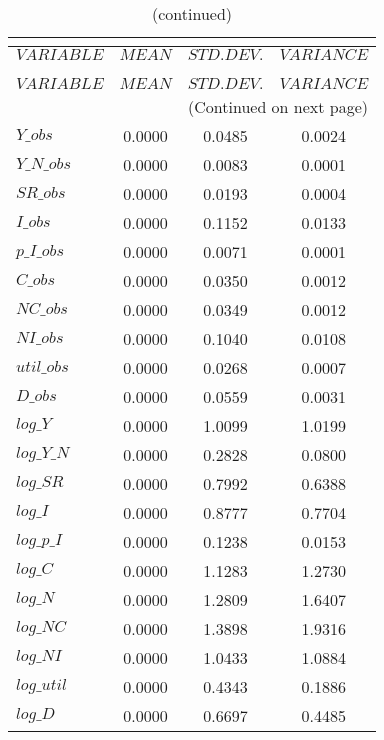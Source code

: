  
\begin{center}
\begin{longtable}{lccc} 
\caption{THEORETICAL MOMENTS}\\
 \label{Table:th_moments}\\
\toprule 
$VARIABLE   $	 & 	 $         MEAN$	 & 	 $    STD. DEV.$	 & 	 $     VARIANCE$\\
\midrule \endfirsthead 
\caption{(continued)}\\
 \toprule \\ 
$VARIABLE   $	 & 	 $         MEAN$	 & 	 $    STD. DEV.$	 & 	 $     VARIANCE$\\
\midrule \endhead 
\midrule \multicolumn{4}{r}{(Continued on next page)} \\ \bottomrule \endfoot 
\bottomrule \endlastfoot 
$Y\_obs     $	 & 	       0.0000	 & 	       0.0485	 & 	       0.0024 \\ 
$Y\_N\_obs  $	 & 	       0.0000	 & 	       0.0083	 & 	       0.0001 \\ 
$SR\_obs    $	 & 	       0.0000	 & 	       0.0193	 & 	       0.0004 \\ 
$I\_obs     $	 & 	       0.0000	 & 	       0.1152	 & 	       0.0133 \\ 
$p\_I\_obs  $	 & 	       0.0000	 & 	       0.0071	 & 	       0.0001 \\ 
$C\_obs     $	 & 	       0.0000	 & 	       0.0350	 & 	       0.0012 \\ 
$NC\_obs    $	 & 	       0.0000	 & 	       0.0349	 & 	       0.0012 \\ 
$NI\_obs    $	 & 	       0.0000	 & 	       0.1040	 & 	       0.0108 \\ 
$util\_obs  $	 & 	       0.0000	 & 	       0.0268	 & 	       0.0007 \\ 
$D\_obs     $	 & 	       0.0000	 & 	       0.0559	 & 	       0.0031 \\ 
$log\_Y     $	 & 	       0.0000	 & 	       1.0099	 & 	       1.0199 \\ 
$log\_Y\_N  $	 & 	       0.0000	 & 	       0.2828	 & 	       0.0800 \\ 
$log\_SR    $	 & 	       0.0000	 & 	       0.7992	 & 	       0.6388 \\ 
$log\_I     $	 & 	       0.0000	 & 	       0.8777	 & 	       0.7704 \\ 
$log\_p\_I  $	 & 	       0.0000	 & 	       0.1238	 & 	       0.0153 \\ 
$log\_C     $	 & 	       0.0000	 & 	       1.1283	 & 	       1.2730 \\ 
$log\_N     $	 & 	       0.0000	 & 	       1.2809	 & 	       1.6407 \\ 
$log\_NC    $	 & 	       0.0000	 & 	       1.3898	 & 	       1.9316 \\ 
$log\_NI    $	 & 	       0.0000	 & 	       1.0433	 & 	       1.0884 \\ 
$log\_util  $	 & 	       0.0000	 & 	       0.4343	 & 	       0.1886 \\ 
$log\_D     $	 & 	       0.0000	 & 	       0.6697	 & 	       0.4485 \\ 
\end{longtable}
 \end{center}
